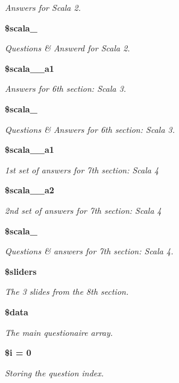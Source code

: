 \begin{CompactItemize}
\begin{CompactList}\small\item\em Answers for Scala 2. \item\end{CompactList}\item 
\bf{\$scala\_}
\begin{CompactList}\small\item\em Questions \& Answerd for Scala 2. \item\end{CompactList}\item 
\bf{\$scala\_\_\-a1}
\begin{CompactList}\small\item\em Answers for 6th section: Scala 3. \item\end{CompactList}\item 
\bf{\$scala\_}
\begin{CompactList}\small\item\em Questions \& Answers for 6th section: Scala 3. \item\end{CompactList}\item 
\bf{\$scala\_\_\-a1}
\begin{CompactList}\small\item\em 1st set of answers for 7th section: Scala 4 \item\end{CompactList}\item 
\bf{\$scala\_\_\-a2}
\begin{CompactList}\small\item\em 2nd set of answers for 7th section: Scala 4 \item\end{CompactList}\item 
\bf{\$scala\_}
\begin{CompactList}\small\item\em Questions \& answers for 7th section: Scala 4. \item\end{CompactList}\item 
\bf{\$sliders}
\begin{CompactList}\small\item\em The 3 slides from the 8th section. \item\end{CompactList}\item 
\bf{\$data}
\begin{CompactList}\small\item\em The main questionaire array. \item\end{CompactList}\item 
\bf{\$i} = 0
\begin{CompactList}\small\item\em Storing the question index. \item\end{CompactList}\end{CompactItemize}


